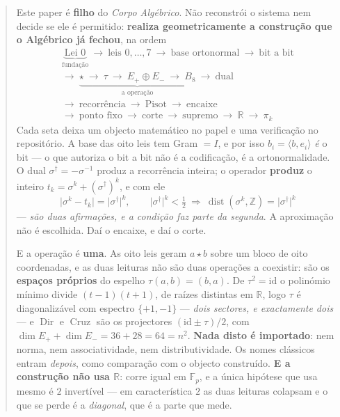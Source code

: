\documentclass[11pt,a4paper]{article}
\newcommand{\abs}[1]{\lvert #1\rvert}
\newcommand{\dg}{^{\dagger}}
\begin{document}
\begin{abstract}
\smallskip\noindent Este paper é \textbf{filho} do \emph{Corpo Algébrico}. Não
reconstrói o sistema nem decide se ele é permitido: \textbf{realiza
geometricamente a construção que o Algébrico já fechou}, na ordem
\[
\boxed{\;\begin{gathered}
\underbrace{\text{Lei 0}}_{\text{fundação}}\ \to\ \text{leis }0,\ldots,7\ \to\
\text{base ortonormal}\ \to\ \text{bit a bit}\\
\to\ \underbrace{\star\ \to\ \tau\ \to\ E_{+}\oplus E_{-}\ \to\ B_8}_{\text{a operação}}
\ \to\ \text{dual}\\
\to\ \text{recorrência}\ \to\ \text{Pisot}\ \to\ \text{encaixe}\\
\to\ \text{ponto fixo}\ \to\ \text{corte}\ \to\ \text{supremo}
\ \to\ \mathbb{R}\ \to\ \pi_k
\end{gathered}\;}
\]
Cada seta deixa um objecto matemático no papel e uma verificação no
repositório. A base das
oito leis tem Gram $=I$, e por isso $b_i=\langle b,e_i\rangle$ \emph{é} o bit
--- o que autoriza o bit a bit não é a codificação, é a ortonormalidade. O dual
$\sigma\dg=-\sigma^{-1}$ produz a recorrência inteira; o operador \textbf{produz}
o inteiro $t_k=\sigma^{k}+(\sigma\dg)^{k}$, e com ele
\[
\abs{\sigma^{k}-t_k}=\abs{\sigma\dg}^{k},
\qquad
\abs{\sigma\dg}^{k}<\tfrac12\ \Longrightarrow\
\operatorname{dist}(\sigma^{k},\mathbb{Z})=\abs{\sigma\dg}^{k}
\]
--- \emph{são duas afirmações, e a condição faz parte da segunda}. A aproximação
não é escolhida. Daí o encaixe, e daí o corte.

\smallskip\noindent
E a operação é \textbf{uma}. As oito leis geram $a\star b$ sobre um bloco de oito
coordenadas, e as duas leituras não são duas operações a coexistir: são os
\textbf{espaços próprios} do espelho $\tau(a,b)=(b,a)$. De $\tau^{2}=\mathrm{id}$ o
polinómio mínimo divide $(t-1)(t+1)$, de raízes distintas em $\mathbb{R}$, logo $\tau$ é
diagonalizável com espectro $\{+1,-1\}$ --- \emph{dois sectores, e exactamente dois} ---
e $\operatorname{Dir}$ e $\operatorname{Cruz}$ são os projectores
$(\mathrm{id}\pm\tau)/2$, com $\dim E_{+}+\dim E_{-}=36+28=64=n^{2}$. \textbf{Nada disto
é importado}: nem norma, nem associatividade, nem distributividade. Os nomes clássicos
entram \emph{depois}, como comparação com o objecto construído. \textbf{E a construção
não usa $\mathbb{R}$}: corre igual em $\mathbb{F}_p$, e a única hipótese que usa mesmo é
$2$ invertível --- em característica $2$ as duas leituras colapsam e o que se perde é a
\emph{diagonal}, que é a parte que mede.


\end{abstract}
\end{document}
